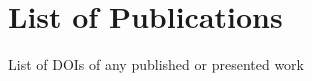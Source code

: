 \documentclass[MS,synopsis]{iitmdiss}
\begin{document}

%




\section{List of Publications}
List of DOIs of any published or presented work

%

\small %
	
\end{document}
